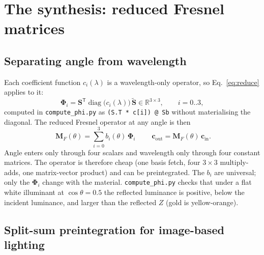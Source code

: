 \documentclass[11pt,a4paper]{article}
\newcommand{\mS}{\mathbf{S}}
\newcommand{\mSd}{\tilde{\mathbf{S}}}
\newcommand{\mPhi}{\boldsymbol{\Phi}}
\newcommand{\mM}{\mathbf{M}}
\newcommand{\vc}{\mathbf{c}}
\newcommand{\lam}{\lambda}
\newcommand{\diag}{\operatorname{diag}}
\newcommand{\transp}{^{\mathsf{T}}}
\newcommand{\file}[1]{\texttt{#1}}
\newcommand{\code}[1]{\texttt{#1}}
\begin{document}
\section{The synthesis: reduced Fresnel matrices}
\label{sec:synthesis}

\subsection{Separating angle from wavelength}

Each coefficient function $c_i(\lam)$ is a wavelength-only operator, so
Eq.~\eqref{eq:reduce} applies to it:
\begin{equation}
  \mPhi_i=\mS\transp\diag\!\big(c_i(\lam)\big)\,\mSd\in\mathbb{R}^{3\times3},
  \qquad i=0..3,
  \label{eq:phi}
\end{equation}
computed in \file{compute\_phi.py} as \code{(S.T * c[i]) @ Sb} without
materialising the diagonal.  The reduced Fresnel operator at any angle is then
\begin{equation}
  \boxed{\;\mM_F(\theta)=\sum_{i=0}^{3}b_i(\theta)\,\mPhi_i\;}
  \qquad \vc_{\text{out}}=\mM_F(\theta)\,\vc_{\text{in}} .
  \label{eq:MF}
\end{equation}
Angle enters only through four scalars and wavelength only through four
constant matrices.  The operator is therefore cheap (one basis fetch, four
$3\times3$ multiply-adds, one matrix-vector product) and can be
preintegrated.  The $b_i$ are universal; only the $\mPhi_i$ change with the
material.  \file{compute\_phi.py} checks that under a flat white illuminant at
$\cos\theta=0.5$ the reflected luminance is positive, below the incident
luminance, and larger than the reflected $Z$ (gold is yellow-orange).

\subsection{Split-sum preintegration for image-based lighting}
\label{sec:splitsum}
\end{document}
